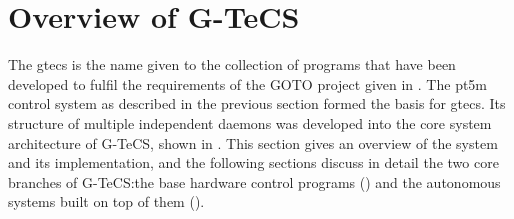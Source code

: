\begin{colsection}
\begin{colsection}
\end{colsection}


\end{colsection}


\newpage
\section{Overview of G-TeCS}
\label{sec:gtecs}
\begin{colsection}


\begin{colsection}

The \gls{gtecs} is the name given to the collection of programs that have been developed to fulfil the requirements of the GOTO project given in . The \gls{pt5m} control system as described in the previous section formed the basis for \gls{gtecs}. Its structure of multiple independent daemons was developed into the core system architecture of G-TeCS, shown in . This section gives an overview of the system and its implementation, and the following sections discuss in detail the two core branches of G-TeCS:\@ the base hardware control programs () and the autonomous systems built on top of them ().


\end{colsection}
\end{colsection}
